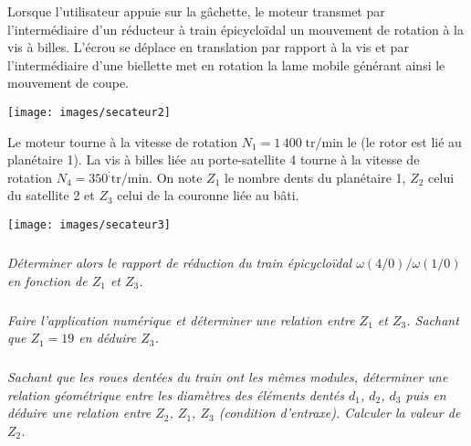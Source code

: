 \documentclass[10pt,fleqn]{article} %
\begin{document}
\begin{multicols}{2}
%


Lorsque l’utilisateur appuie sur la gâchette, le moteur transmet par l’intermédiaire d’un réducteur à train épicycloïdal un mouvement de rotation à la vis à billes. L’écrou se déplace en translation par rapport à la vis et par l’intermédiaire d’une biellette met en rotation la lame mobile générant ainsi le mouvement de coupe. 

\begin{center}
 \texttt{[image: images/secateur2]}
\end{center}




Le moteur tourne à la vitesse de rotation $N_1=1\,400\;\text{tr/min}$ le (le rotor est lié au planétaire 1). La vis à billes liée au porte-satellite 4 tourne à la vitesse de rotation $N_4=350^; \text{tr/min}$. On note $Z_1$ le nombre dents du planétaire 1, $Z_2$ celui du satellite 2 et $Z_3$ celui de la couronne liée au bâti.

\begin{center}
 \texttt{[image: images/secateur3]}
\end{center}



\subparagraph{}
\textit{Déterminer alors le rapport de réduction du train épicycloïdal $\omega(4/0)/\omega(1/0)$ en fonction de $Z_1$ et $Z_3$.}
 \ifprof
 \begin{corrige}
 \end{corrige}
 \else
 \fi
 
\subparagraph{}
\textit{Faire l’application numérique et déterminer une relation entre $Z_1$ et $Z_3$. Sachant que $Z_1=19$ en déduire $Z_3$.}
 \ifprof
 \begin{corrige}
 \end{corrige}
 \else
 \fi
 
\subparagraph{}
\textit{Sachant que les roues dentées du train ont les mêmes modules, déterminer une relation géométrique entre les diamètres des éléments dentés $d_1$, $d_2$, $d_3$ puis en déduire une relation entre $Z_2$, $Z_1$, $Z_3$ (condition d’entraxe). Calculer la valeur de $Z_2$.}

 \ifprof
 \begin{corrige}
 \end{corrige}
 \else
 \fi




\end{multicols}
\end{document}
